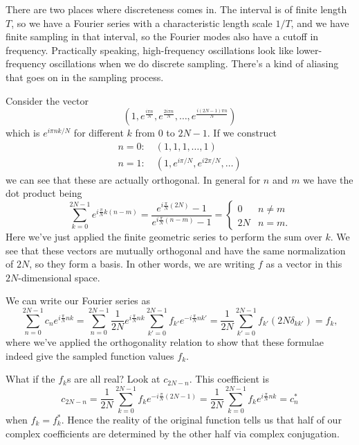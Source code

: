 There are two places where discreteness comes in. The interval is of finite length $T$, so we have a Fourier series with a characteristic length scale $1/T$, and we have finite sampling in that interval, so the Fourier modes also have a cutoff in frequency. Practically speaking, high-frequency oscillations look like lower-frequency oscillations when we do discrete sampling. There's a kind of aliasing that goes on in the sampling process.

Consider the vector
\begin{equation}
    (1,e^{\frac{i\pi n}{N}},e^{\frac{2i\pi n}{N}},\dots,e^{\frac{i(2N-1)\pi n}{N}})
\end{equation}
which is $e^{i\pi nk/N}$ for different $k$ from $0$ to $2N-1$. If we construct
\begin{gather*}
    n=0: \quad (1,1,1,\dots,1)\\
    n=1: \quad (1, e^{i\pi/N}, e^{i2\pi/N},\dots)
\end{gather*}
we can see that these are actually orthogonal. In general for $n$ and $m$ we have the dot product being
\begin{equation}
    \sum_{k=0}^{2N-1} e^{i\frac{\pi}{N}k(n-m)}= \frac{e^{i\frac{\pi}{N}(2N)}-1}{e^{i\frac{\pi}{N}(n-m)}-1} =\begin{cases}
        0 & n \neq m\\
        2N & n = m.
    \end{cases}
\end{equation}
Here we've just applied the finite geometric series to perform the sum over $k$. We see that these vectors are mutually orthogonal and have the same normalization of $2N$, so they form a basis. In other words, we are writing $f$ as a vector in this $2N$-dimensional space.

We can write our Fourier series as
\begin{equation}
    \sum_{n=0}^{2N-1} c_n e^{i\frac{\pi}{N}nk} = \sum_{n=0}^{2N-1} \frac{1}{2N} e^{i\frac{\pi}{N}nk} \sum_{k'=0}^{2N-1} f_{k'} e^{-i\frac{\pi}{N}nk'} = \frac{1}{2N} \sum_{k'=0}^{2N-1} f_{k'} (2N \delta_{kk'}) = f_k,
\end{equation}
where we've applied the orthogonality relation to show that these formulae indeed give the sampled function values $f_k$.

What if the $f_k$s are all real? Look at $c_{2N-n}$. This coefficient is
\begin{equation}
    c_{2N-n} =\frac{1}{2N} \sum_{k=0}^{2N-1} f_k e^{-i\frac{\pi}{N}(2N-1)} = \frac{1}{2N} \sum_{k=0}^{2N-1} f_k e^{i\frac{\pi}{N}nk} = c_n^*
\end{equation}
when $f_k=f_k^*$. Hence the reality of the original function tells us that half of our complex coefficients are determined by the other half via complex conjugation.


